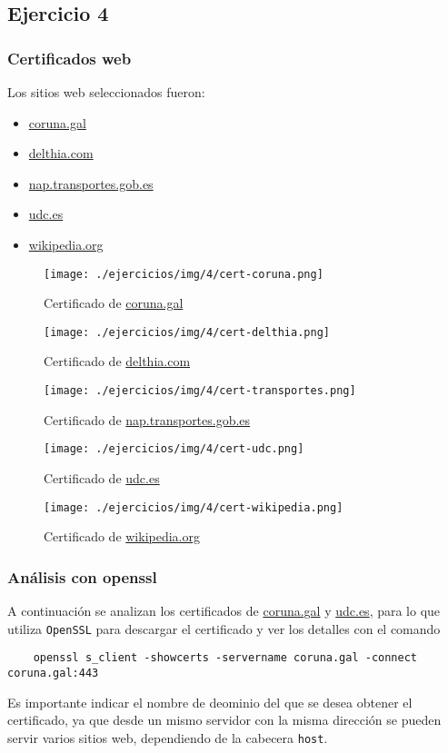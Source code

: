 \subsection{Ejercicio 4}

\subsubsection{Certificados web}

Los sitios web seleccionados fueron:
\begin{itemize}
    \item \href{https://www.coruna.gal}{coruna.gal}
    \item \href{https://delthia.com}{delthia.com}
    \item \href{https://nap.transportes.gob.es}{nap.transportes.gob.es}
    \item \href{https://www.udc.es}{udc.es}
    \item \href{www.wikipedia.org}{wikipedia.org}
\end{itemize}

\begin{figure}[h]
    \texttt{[image: ./ejercicios/img/4/cert-coruna.png]}
    \caption{Certificado de \url{coruna.gal}}
\end{figure}

\begin{figure}[h]
    \texttt{[image: ./ejercicios/img/4/cert-delthia.png]}
    \caption{Certificado de \url{delthia.com}}
\end{figure}

\begin{figure}[h]
    \texttt{[image: ./ejercicios/img/4/cert-transportes.png]}
    \caption{Certificado de \url{nap.transportes.gob.es}}
\end{figure}

\begin{figure}[h]
    \texttt{[image: ./ejercicios/img/4/cert-udc.png]}
    \caption{Certificado de \url{udc.es}}
\end{figure}

\begin{figure}[h]
    \texttt{[image: ./ejercicios/img/4/cert-wikipedia.png]}
    \caption{Certificado de \url{wikipedia.org}}
\end{figure}

\subsubsection{Análisis con openssl}

A continuación se analizan los certificados de \url{coruna.gal} y \url{udc.es}, para lo que utiliza \texttt{OpenSSL} para descargar el certificado y ver los detalles con el comando

\begin{lstlisting}
    openssl s_client -showcerts -servername coruna.gal -connect coruna.gal:443
\end{lstlisting}

Es importante indicar el nombre de deominio del que se desea obtener el certificado, ya que desde un mismo servidor con la misma dirección se pueden servir varios sitios web, dependiendo de la cabecera \texttt{host}.